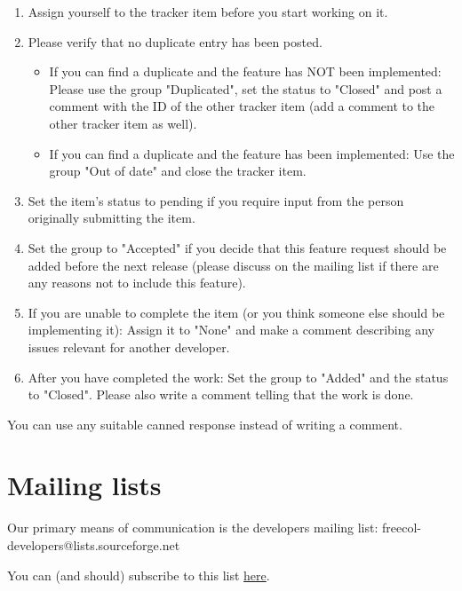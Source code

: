 \documentclass[12pt]{book}
\begin{document}
\begin{enumerate}
\item Assign yourself to the tracker item before you start working on it.

\item Please verify that no duplicate entry has been posted.

\begin{itemize}
\item If you can find a duplicate and the feature has NOT been
  implemented: Please use the group "Duplicated", set the status to
  "Closed" and post a comment with the ID of the other tracker item
  (add a comment to the other tracker item as well).

\item If you can find a duplicate and the feature has been
  implemented: Use the group "Out of date" and close the tracker item.
\end{itemize}

\item Set the item's status to pending if you require input from the person
   originally submitting the item.

\item Set the group to "Accepted" if you decide that this feature
   request should be added before the next release (please discuss on
   the mailing list if there are any reasons not to include this
   feature).

\item If you are unable to complete the item (or you think someone else
   should be implementing it): Assign it to "None" and make a comment
   describing any issues relevant for another developer.

\item After you have completed the work: Set the group to "Added"
   and the status to "Closed". Please also write a comment telling that
   the work is done.
\end{enumerate}

You can use any suitable canned response instead of writing a comment.


\hypertarget{Mailing lists}{\section{Mailing lists}}

Our primary means of communication is the developers mailing list:
freecol-developers@lists.sourceforge.net

You can (and should) subscribe to this list
\href{http://lists.sourceforge.net/lists/listinfo/freecol-developers}{here}.
\end{document}
